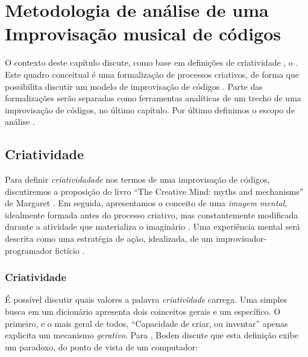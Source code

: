 \chapter{Metodologia de análise de uma Improvisação musical de códigos}\label{cap:metodologia}

O contexto deste capítulo discute, como base em definições de criatividade , o  . Este quadro conceitual é uma formalização de processos criativos, de forma que possibilita discutir um modelo de improvisação de códigos . Parte das formalizações serão separadas como ferramentas analíticas  de um trecho de uma improvisação de códigos, no último capítulo. Por último definimos o escopo de análise .

\section{Criatividade}\label{sec:criatividade}

Para  definir \emph{criatividadade} nos termos de uma improvisação de códigos, discutiremos a proposição do livro ``The Creative Mind: myths and mechanisms'' de Margaret   . Em seguida, apresentamos o conceito de uma \emph{imagem mental}, idealmente formada antes do processo criativo, mas constantemente modificada durante a atividade que materializa o imaginário . Uma experiência mental será descrita como uma estratégia de ação, idealizada, de um improvisador-programador fictício . 

\subsection{Criatividade}\label{sec:diferencas}

É possível discutir quais valores a palavra \emph{criatividade} carrega. Uma simples busca em um dicionário apresenta  dois coinceitos gerais e um específico. O primeiro, e o mais geral de todos, ``Capacidade de criar, ou inventar''  apenas explicita um mecanismo \emph{gerativo}. Para , Boden discute que esta definição exibe um paradoxo, do ponto de vista de um computador:

